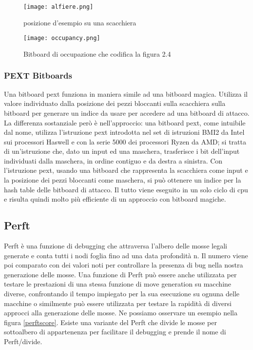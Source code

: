 \begin{figure}
    \centering
    \begin{minipage}{0.45\textwidth}
        \centering
        \texttt{[image: alfiere.png]} %
        \caption{posizione d'esempio su una scacchiera}
        \label{aaa}
    \end{minipage}\hfill
    \begin{minipage}{0.45\textwidth}
        \centering
        \texttt{[image: occupancy.png]} %
        \caption{Bitboard di occupazione che codifica la figura 2.4}
        \label{bbb}
    \end{minipage}
\end{figure}




\subsubsection{PEXT Bitboards}
Una bitboard pext funziona in maniera simile ad una bitboard magica. Utilizza il valore individuato dalla posizione dei pezzi bloccanti sulla scacchiera sulla bitboard per generare un indice da usare per accedere ad una
bitboard di attacco. La differenza sostanziale però è nell'approccio: una bitboard pext, come intuibile dal nome, utilizza l'istruzione pext introdotta nel set di istruzioni BMI2 da Intel sui processori Haswell e con 
la serie 5000 dei processori Ryzen da AMD; si tratta di un'istruzione che, dato un input ed una maschera, trasferisce i bit dell'input individuati dalla maschera, in ordine contiguo e da destra a sinistra.
Con l'istruzione pext, usando una bitboard che rappresenta la scacchiera come input e la posizione dei pezzi bloccanti come maschera, si può ottenere un indice per la hash table delle bitboard di attacco. Il tutto viene eseguito in un solo ciclo 
di cpu e risulta quindi molto più efficiente di un approccio con bitboard magiche.


\subsection{Perft}
Perft è una funzione di debugging che attraversa l'albero delle mosse legali generate e conta tutti i nodi foglia fino ad una data profondità n.
Il numero viene poi comparato con dei valori noti per controllare la presenza di bug nella nostra generazione delle mosse.
Una funzione di Perft può essere anche utilizzata per testare le prestazioni di una stessa funzione di move generation su macchine diverse, confrontando il tempo impiegato per la sua esecuzione su ognuna delle macchine
o similmente può essere utilizzata per testare la rapidità di diversi approcci alla generazione delle mosse. Ne possiamo osservare un esempio nella figura \ref{perftscore}.
Esiste una variante del Perft che divide le mosse per sottoalbero di appartenenza per facilitare il debugging e prende il nome di Perft/divide.


